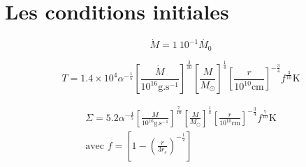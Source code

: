 \documentclass[french]{beamer}
\begin{document}
	\section{Les conditions initiales}
\begin{frame}
	\begin{equation}
	\dot{M} = 1\ 10^{-1 }\dot{M_{0}}
\end{equation} 

\begin{equation}
	T = 1.4 \times 10^{4} \alpha^{- \frac{1}{5}} \left[ \frac{\dot{M}}{10^{16} \mathrm{g.s}^{-1}} \right]^{\frac{3}{10}} \left[ \frac{M}{M_\odot}\right]^{\frac{1}{4}} \left[ \frac{r}{10^{10}\mathrm{cm}}\right]^{- \frac{3}{4}} f^{\frac{3}{10}} \mathrm{K} 
\end{equation}

\begin{align}
	\Sigma = 5.2 \alpha^{- \frac{4}{5}} \left[ \frac{\dot{M}}{10^{16} \mathrm{g.s}^{-1}} \right]^{\frac{7}{10}} \left[ \frac{M}{M_\odot}\right]^{\frac{1}{4}} \left[ \frac{r}{10^{10} \mathrm{cm}}\right]^{- \frac{3}{4}} f^{\frac{7}{10}} \mbox{K}  \\ 
	\text{avec } f = \left[ 1 - \left( \frac{r}{3 r_{s}}\right)^{- \frac{1}{2}}\right]
\end{align}
\end{frame}
\end{document}

